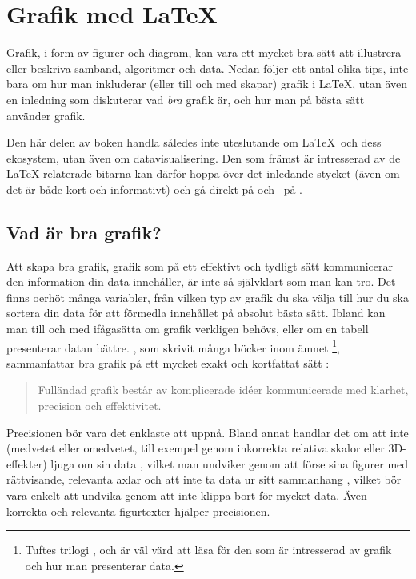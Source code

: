 \documentclass[10pt,../../a4.tex]{subfiles}
\begin{document}
\section{Grafik med \LaTeX}\label{sec:4}
Grafik, i form av figurer och diagram, kan vara ett mycket bra sätt
att illustrera eller beskriva samband, algoritmer och data. Nedan följer
ett antal olika tips, inte bara om hur man inkluderar (eller till och 
med skapar) grafik i \LaTeX, utan även en inledning som diskuterar vad
\emph{bra} grafik är, och hur man på bästa sätt använder grafik.

Den här delen av boken handla således inte uteslutande om \LaTeX\ och
dess ekosystem, utan även om datavisualisering. Den som främst är
intresserad av de \LaTeX-relaterade bitarna kan därför hoppa över
det inledande stycket (även om det är både kort och informativt) och
gå direkt på  och \PGFTikZ\ på
.

\subsection{Vad är bra grafik?}
Att skapa bra grafik, grafik som på ett effektivt och tydligt sätt
kommunicerar den information din data innehåller, är inte så självklart
som man kan tro. Det finns oerhöt många variabler, från vilken typ av
grafik du ska välja \parencite{Henry12} till hur du ska sortera din
data \parencites{Camoes10}[\pno~178]{Tufte01} för att förmedla innehållet
på absolut bästa sätt. Ibland kan man till och med ifågasätta om grafik
verkligen behövs, eller om en tabell presenterar datan bättre.
, som skrivit många böcker inom ämnet%
\footnote{Tuftes trilogi \emph{} \parencite{Tufte01},
	\emph{} \parencite{Tufte90} och
	\emph{} \parencite{Tufte97} är väl värd att läsa
	för den som är intresserad av grafik och hur man presenterar data.},
sammanfattar bra grafik på ett mycket exakt och kortfattat sätt
\textcite[\pno~51]{Tufte01}:
\begin{quotation}
	Fulländad grafik består av komplicerade idéer kommunicerade med
	klarhet, precision och effektivitet.
\end{quotation}

Precisionen bör vara det enklaste att uppnå. 
Bland annat handlar det om att inte (medvetet eller omedvetet, till
exempel genom inkorrekta relativa skalor eller 3D-effekter)
ljuga om sin data \parencite[\ppno~57\psqq]{Tufte01},
vilket man undviker genom att förse sina figurer med rättvisande,
relevanta axlar och att inte ta data ur sitt sammanhang
\parencite[\ppno~75\psq]{Tufte01}, vilket bör vara enkelt att undvika
genom att inte klippa bort för mycket data.
Även korrekta och relevanta figurtexter hjälper precisionen.
\end{document}
